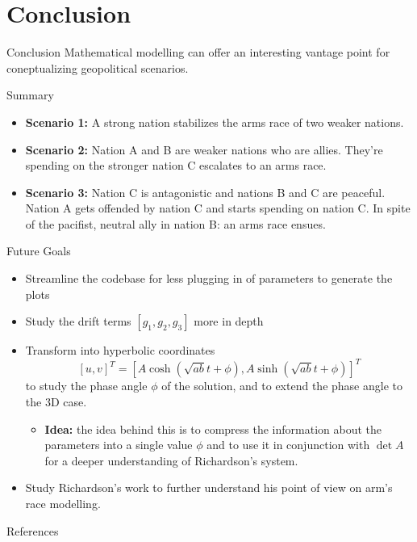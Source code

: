 \documentclass{beamer}
\begin{document}
\section{Conclusion}
\begin{frame}{Conclusion}
  Mathematical modelling can offer an interesting vantage point for coneptualizing geopolitical scenarios.
  \begin{block}{Summary}
    \begin{itemize}
      \item \textbf{Scenario 1:} A strong nation stabilizes the arms race of two weaker nations.
      \item \textbf{Scenario 2:} Nation A and B are weaker nations who are allies. They're spending on the stronger nation C escalates to an arms race.
      \item \textbf{Scenario 3:} Nation C is antagonistic and nations B and C are peaceful. Nation A gets offended by nation C and starts spending on nation C. In spite of the pacifist, neutral ally in nation B: an arms race ensues.
    \end{itemize}
  \end{block}
\end{frame}
\begin{frame}{Future Goals}
  \begin{itemize}
    \item Streamline the codebase for less plugging in of parameters to generate the plots
    \item Study the drift terms $\left[g_1,g_2,g_3\right]$ more in depth
    \item Transform into hyperbolic coordinates
      \begin{equation*}
	\left[u,v\right]^T=\left[A\cosh(\sqrt{ab}t+\phi),A\sinh(\sqrt{ab}t+\phi)\right]^T
      \end{equation*}
  to study the phase angle $\phi$ of the solution, and to extend the phase angle to the 3D case.
  \begin{itemize}
    \item \textbf{Idea: } the idea behind this is to compress the information about the parameters into a single value $\phi$ and to use it in conjunction with $\det{A}$ for a deeper understanding of Richardson's system.
  \end{itemize}
\item Study Richardson's work to further understand his point of view on arm's race modelling.
\end{itemize}
\end{frame}

\begin{frame}{References}
  \printbibliography
\end{frame}
\end{document}
